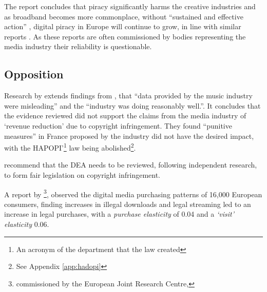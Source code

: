 



The report concludes that piracy significantly harms the creative industries and as broadband becomes more commonplace, without ``sustained and effective action'' \citep[p.46]{tera2010}, digital piracy in Europe will continue to grow, in line with similar reports \citep{europeeconomics2008, oecd2009}. As these reports are often commissioned by bodies representing the media industry their reliability is questionable.

\subsection{Opposition}

Research by \citet{lse2013} extends findings from \citet{lse2011}, that ``data provided by the music industry were misleading'' and the ``industry was doing reasonably well.''. It concludes that the evidence reviewed did not support the claims from the media industry of `revenue reduction' due to copyright infringement.
They found ``punitive measures'' in France proposed by the industry did not have the desired impact, with the HAPOPI'\footnote{An acronym of the department that the law created} law being abolished\footnote{See Appendix \ref{app:hadopi}}.

\citet{lse2013} recommend that the DEA needs to be reviewed, following independent research, to form fair legislation on copyright infringement.

A report by \citet{aguiar2013}\footnote{commissioned by the European Joint Research Centre,}, observed the digital media purchasing patterns of 16,000 European consumers, finding increases in illegal downloads and legal streaming led to an increase in legal purchases, with a \textit{purchase elasticity} of 0.04 and a \textit{`visit' elasticity} 0.06.


